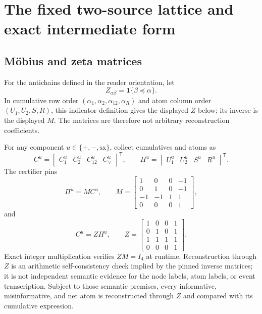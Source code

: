 \documentclass[11pt]{article}
\theoremstyle{definition}
\newcommand{\sx}{\mathrm{sx}}
\begin{document}
\section{The fixed two-source lattice and exact intermediate form}\label{sec:lattice}

\subsection{M{\"o}bius and zeta matrices}

For the antichains defined in the reader orientation, let
\[
  Z_{\alpha\beta}=\mathbf 1\{\beta\preceq\alpha\}.
\]
In cumulative row order
\((\alpha_1,\alpha_2,\alpha_{12},\alpha_R)\) and atom column order
\((U_1,U_2,S,R)\), this indicator definition gives the displayed \(Z\) below; its inverse is the
displayed \(M\).  The matrices are therefore not arbitrary reconstruction coefficients.

For any component $u\in\{+,-,\sx\}$, collect cumulatives and atoms as
\begin{equation}
  C^u=
  \begin{bmatrix}
    C^u_1&C^u_2&C^u_{12}&C^u_\vee
  \end{bmatrix}^{\mathsf T},
  \qquad
  \Pi^u=
  \begin{bmatrix}
    U^u_1&U^u_2&S^u&R^u
  \end{bmatrix}^{\mathsf T}.
\end{equation}
The certifier pins
\begin{equation}
  \Pi^u=M C^u,
  \qquad
  M=
  \begin{bmatrix}
     1& 0& 0&-1\\
     0& 1& 0&-1\\
    -1&-1& 1& 1\\
     0& 0& 0& 1
  \end{bmatrix},
\end{equation}
and
\begin{equation}
  C^u=Z\Pi^u,
  \qquad
  Z=
  \begin{bmatrix}
    1&0&0&1\\
    0&1&0&1\\
    1&1&1&1\\
    0&0&0&1
  \end{bmatrix}.
\end{equation}
Exact integer multiplication verifies $ZM=I_4$ at runtime.  Reconstruction through \(Z\) is an
arithmetic self-consistency check implied by the pinned inverse matrices; it is not independent
semantic evidence for the node labels, atom labels, or event transcription.  Subject to those
semantic premises, every informative, misinformative, and net atom is reconstructed through \(Z\)
and compared with its cumulative expression.
\end{document}
